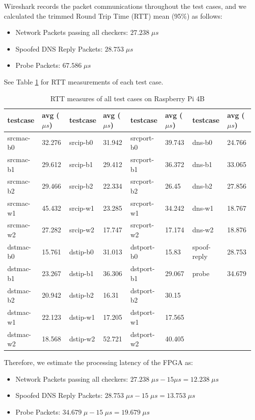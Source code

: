\documentclass[a4paper]{report}
\begin{document}
Wireshark records the packet communications throughout the test cases, and we calculated the trimmed Round Trip Time (RTT) mean (95\%) as follows:
\begin{itemize}[noitemsep]
    \item Network Packets passing all checkers: $27.238\; \mu s$
    \item Spoofed DNS Reply Packets: $28.753\; \mu s$
    \item Probe Packets: $67.586\; \mu s$
\end{itemize}
See Table \ref{table:performance-test} for RTT measurements of each test case.

\begin{table}[h!]
\begin{tabular}{ll|ll|ll|ll}
\hline
testcase  & avg ($\mu s$) & testcase & avg ($\mu s$) & testcase   & avg ($\mu s$) & testcase  & avg ($\mu s$) \\ \hline
srcmac-b0 & 32.276   & srcip-b0 & 31.942   & srcport-b0 & 39.743   & dns-b0      & 24.766   \\
srcmac-b1 & 29.612   & srcip-b1 & 29.412   & srcport-b1 & 36.372   & dns-b1      & 33.065   \\
srcmac-b2 & 29.466   & srcip-b2 & 22.334   & srcport-b2 & 26.45    & dns-b2      & 27.856   \\
srcmac-w1 & 45.432   & srcip-w1 & 23.285   & srcport-w1 & 34.242   & dns-w1      & 18.767   \\
srcmac-w2 & 27.282   & srcip-w2 & 17.747   & srcport-w2 & 17.174   & dns-w2      & 18.876   \\
dstmac-b0 & 15.761   & dstip-b0 & 31.013   & dstport-b0 & 15.83    & spoof-reply & 28.753   \\
dstmac-b1 & 23.267   & dstip-b1 & 36.306   & dstport-b1 & 29.067   & probe       & 34.679   \\
dstmac-b2 & 20.942   & dstip-b2 & 16.31    & dstport-b2 & 30.15    &             &          \\
dstmac-w1 & 22.123   & dstip-w1 & 17.205   & dstport-w1 & 17.565   &             &          \\
dstmac-w2 & 18.568   & dstip-w2 & 52.721   & dstport-w2 & 40.405   &             &          \\ \hline
\end{tabular}
\caption{RTT measures of all test cases on Raspberry Pi 4B}
\label{table:performance-test}
\end{table}
Therefore, we estimate the processing latency of the FPGA as:
\begin{itemize}[noitemsep]
    \item Network Packets passing all checkers: $27.238\; \mu s - 15\mu s = 12.238\; \mu s$
    \item Spoofed DNS Reply Packets: $28.753\; \mu s - 15\; \mu s = 13.753\; \mu s$
    \item Probe Packets: $34.679\; \mu - 15\; \mu s = 19.679\; \mu s$
\end{itemize}
\end{document}
